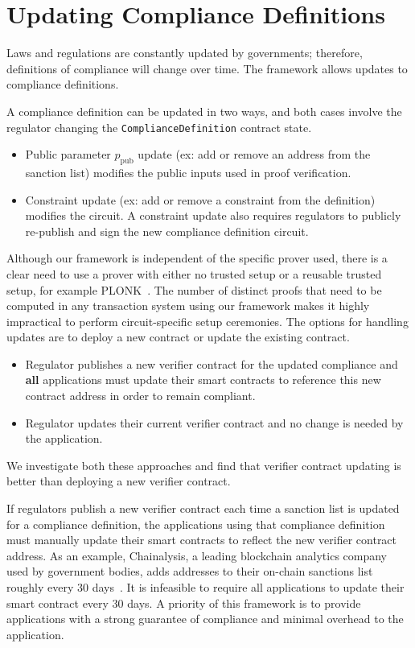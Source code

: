 \documentclass[9pt]{extreport}
\begin{document}
\section{Updating Compliance Definitions}
\label{sec:updateCompDef}
Laws and regulations are constantly updated by governments; therefore, definitions of compliance will change over time.  The framework allows updates to compliance definitions.

A compliance definition can be updated in two ways, and both cases involve the regulator changing the \texttt{ComplianceDefinition} contract state.
\begin{itemize}
    \item Public parameter $p_{\text{pub}}$ update (ex: add or remove an address from the sanction list) modifies the public inputs used in proof verification.
    \item Constraint update (ex: add or remove a constraint from the definition) modifies the circuit.  A constraint update also requires regulators to publicly re-publish and sign the new compliance definition circuit.
\end{itemize}

Although our framework is independent of the specific prover used, there is a clear need to use a prover with either no trusted setup or a reusable trusted setup, for example PLONK~\cite{Gabizon2019PLONKPO}. The number of distinct proofs that need to be computed in any transaction system using our framework makes it highly impractical to perform circuit-specific setup ceremonies. The options for handling updates are to deploy a new contract or update the existing contract.

\begin{itemize}
    \item Regulator publishes a new verifier contract for the updated compliance and \textbf{all} applications must update their smart contracts to reference this new contract address in order to remain compliant.
    \item Regulator updates their current verifier contract and no change is needed by the application.
\end{itemize}

We investigate both these approaches and find that verifier contract updating is better than deploying a new verifier contract.

 If regulators publish a new verifier contract each time a sanction list is updated for a compliance definition, the applications using that compliance definition must manually update their smart contracts to reflect the new verifier contract address.  As an example, Chainalysis, a leading blockchain analytics company used by government bodies, adds addresses to their on-chain sanctions list roughly every 30 days~\cite{chainalysissanctionsoracle}.  It is infeasible to require all applications to update their smart contract every 30 days.  A priority of this framework is to provide applications with a strong guarantee of compliance and minimal overhead to the application.
\end{document}
